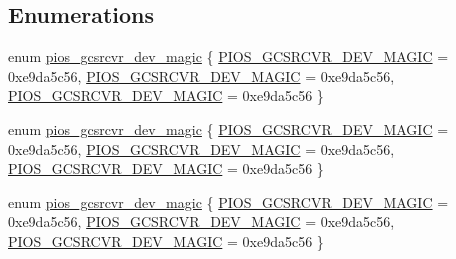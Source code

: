 \subsection*{Enumerations}
\begin{DoxyCompactItemize}
\item 
enum \hyperlink{group___p_i_o_s___g_c_s_r_c_v_r_ga88de96a8f2cf14a06395b79f0996c923}{pios\-\_\-gcsrcvr\-\_\-dev\-\_\-magic} \{ \hyperlink{group___p_i_o_s___g_c_s_r_c_v_r_gga88de96a8f2cf14a06395b79f0996c923a88da7c25cec48e88113746c212106823}{P\-I\-O\-S\-\_\-\-G\-C\-S\-R\-C\-V\-R\-\_\-\-D\-E\-V\-\_\-\-M\-A\-G\-I\-C} = 0xe9da5c56, 
\hyperlink{group___p_i_o_s___g_c_s_r_c_v_r_gga88de96a8f2cf14a06395b79f0996c923a88da7c25cec48e88113746c212106823}{P\-I\-O\-S\-\_\-\-G\-C\-S\-R\-C\-V\-R\-\_\-\-D\-E\-V\-\_\-\-M\-A\-G\-I\-C} = 0xe9da5c56, 
\hyperlink{group___p_i_o_s___g_c_s_r_c_v_r_gga88de96a8f2cf14a06395b79f0996c923a88da7c25cec48e88113746c212106823}{P\-I\-O\-S\-\_\-\-G\-C\-S\-R\-C\-V\-R\-\_\-\-D\-E\-V\-\_\-\-M\-A\-G\-I\-C} = 0xe9da5c56
 \}
\item 
enum \hyperlink{group___p_i_o_s___g_c_s_r_c_v_r_ga88de96a8f2cf14a06395b79f0996c923}{pios\-\_\-gcsrcvr\-\_\-dev\-\_\-magic} \{ \hyperlink{group___p_i_o_s___g_c_s_r_c_v_r_gga88de96a8f2cf14a06395b79f0996c923a88da7c25cec48e88113746c212106823}{P\-I\-O\-S\-\_\-\-G\-C\-S\-R\-C\-V\-R\-\_\-\-D\-E\-V\-\_\-\-M\-A\-G\-I\-C} = 0xe9da5c56, 
\hyperlink{group___p_i_o_s___g_c_s_r_c_v_r_gga88de96a8f2cf14a06395b79f0996c923a88da7c25cec48e88113746c212106823}{P\-I\-O\-S\-\_\-\-G\-C\-S\-R\-C\-V\-R\-\_\-\-D\-E\-V\-\_\-\-M\-A\-G\-I\-C} = 0xe9da5c56, 
\hyperlink{group___p_i_o_s___g_c_s_r_c_v_r_gga88de96a8f2cf14a06395b79f0996c923a88da7c25cec48e88113746c212106823}{P\-I\-O\-S\-\_\-\-G\-C\-S\-R\-C\-V\-R\-\_\-\-D\-E\-V\-\_\-\-M\-A\-G\-I\-C} = 0xe9da5c56
 \}
\item 
enum \hyperlink{group___p_i_o_s___g_c_s_r_c_v_r_ga88de96a8f2cf14a06395b79f0996c923}{pios\-\_\-gcsrcvr\-\_\-dev\-\_\-magic} \{ \hyperlink{group___p_i_o_s___g_c_s_r_c_v_r_gga88de96a8f2cf14a06395b79f0996c923a88da7c25cec48e88113746c212106823}{P\-I\-O\-S\-\_\-\-G\-C\-S\-R\-C\-V\-R\-\_\-\-D\-E\-V\-\_\-\-M\-A\-G\-I\-C} = 0xe9da5c56, 
\hyperlink{group___p_i_o_s___g_c_s_r_c_v_r_gga88de96a8f2cf14a06395b79f0996c923a88da7c25cec48e88113746c212106823}{P\-I\-O\-S\-\_\-\-G\-C\-S\-R\-C\-V\-R\-\_\-\-D\-E\-V\-\_\-\-M\-A\-G\-I\-C} = 0xe9da5c56, 
\hyperlink{group___p_i_o_s___g_c_s_r_c_v_r_gga88de96a8f2cf14a06395b79f0996c923a88da7c25cec48e88113746c212106823}{P\-I\-O\-S\-\_\-\-G\-C\-S\-R\-C\-V\-R\-\_\-\-D\-E\-V\-\_\-\-M\-A\-G\-I\-C} = 0xe9da5c56
 \}
\end{DoxyCompactItemize}
